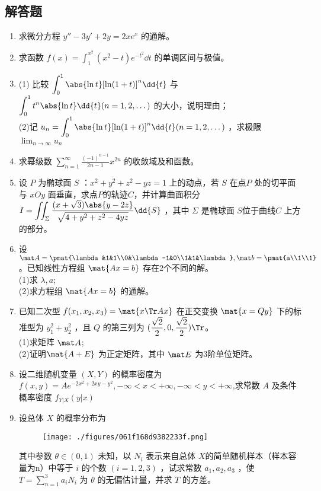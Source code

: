 \subsection{解答题}
\begin{enumerate}
\item 求微分方程 $y''-3y'+2y=2xe^x$ 的通解。
\item 求函数 $\displaystyle f(x)=\int_{1}^{x^2}(x^2-t)e^{-t^2}\dd{t}$ 的单调区间与极值。
\item (1) 比较 $\displaystyle \int_0^1 \abs{\ln t}[\ln (1+t)]^n\dd{t} $ 与  $\displaystyle \int_0^1 t^n \abs{\ln t}\dd{t} (n=1,2,\dots)$ 的大小，说明理由；\\
(2)记 $\displaystyle u_n= \int_0^1 \abs{\ln t}[\ln (1+t)]^n\dd{t} (n=1,2,\dots)$ ，求极限  $\displaystyle \lim_{n\to\infty} u_n$
\item  求幂级数 $\displaystyle \sum_{n=1}^\infty \frac{(-1)^{n-1}}{2n-1}x^{2n}$ 的收敛域及和函数。
\item 设 $P$ 为椭球面 $S$ ：$x^2+y^2+z^2-yz=1$   上的动点，若 $S$ 在点$ P$ 处的切平面与 $xOy$ 面垂直，求点$P$的轨迹$C$，并计算曲面积分 $\displaystyle I=\iint_\Sigma \frac{(x+\sqrt{3})\abs{y-2z}}{\sqrt{4+y^2+z^2-4yz}}\dd{S}$  ，其中 $\Sigma$ 是椭球面  $S$位于曲线$ C$ 上方的部分。
\item 设 $\mat A=\pmat{\lambda &1&1\\0&\lambda-1&0\\1&1&\lambda},\mat b=\pmat{a\\1\\1}$  。已知线性方程组 $\mat {Ax=b}$ 存在2个不同的解。\\
(1)求 $\lambda,a$;\\
(2)求方程组 $\mat {Ax=b}$ 的通解。
\item 已知二次型 $f(x_1,x_2,x_3)=\mat {x \Tr Ax}$  在正交变换 $\mat {x=Qy}$ 下的标准型为 $y_1^2+y_2^2$  ，且 $Q$ 的第三列为 $\displaystyle (\frac{\sqrt{2}}{2},0,\frac{\sqrt{2}}{2})\Tr$。\\
(1)求矩阵  $\mat A$;\\
(2)证明$\mat{ A+E}$  为正定矩阵，其中 $\mat E$ 为3阶单位矩阵。
\item 设二维随机变量 $(X,Y)$ 的概率密度为 $\displaystyle f(x,y)=Ae^{-2x^2+2xy-y^2},-\infty<x<+\infty,-\infty<y<+\infty$,求常数 $A$ 及条件概率密度 $f_{Y|X}(y|x)$
\item 设总体 $X$ 的概率分布为
\begin{figure}[ht]
\centering
\texttt{[image: ./figures/061f168d9382233f.png]}
\caption{} \label{fig_PeeM10_1}
\end{figure}
其中参数 $\theta \in (0,1)$  未知，以 $N_i$ 表示来自总体 $X $的简单随机样本（样本容量为n）中等于 $i$ 的个数 $(i=1,2,3)$  ，试求常数  $a_1,a_2,a_3$  ，使  $\displaystyle T=\sum_{n=1}^3 a_iN_i$ 为 $\theta$  的无偏估计量，并求 $T$ 的方差。
\end{enumerate}